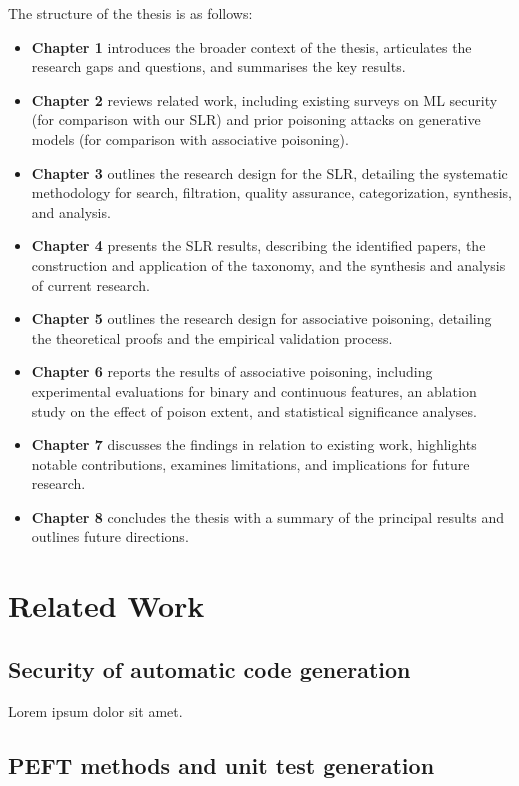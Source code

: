 \documentclass[12pt]{book}
\begin{document}
The structure of the thesis is as follows:
\begin{itemize}
    \item \textbf{Chapter 1} introduces the broader context of the thesis, articulates the research gaps and questions, and summarises the key results.
    \item \textbf{Chapter 2} reviews related work, including existing surveys on ML security (for comparison with our SLR) and prior poisoning attacks on generative models (for comparison with associative poisoning).
    \item \textbf{Chapter 3} outlines the research design for the SLR, detailing the systematic methodology for search, filtration, quality assurance, categorization, synthesis, and analysis.
    \item \textbf{Chapter 4} presents the SLR results, describing the identified papers, the construction and application of the taxonomy, and the synthesis and analysis of current research.
    \item \textbf{Chapter 5} outlines the research design for associative poisoning, detailing the theoretical proofs and the empirical validation process.
    \item \textbf{Chapter 6} reports the results of associative poisoning, including experimental evaluations for binary and continuous features, an ablation study on the effect of poison extent, and statistical significance analyses.
    \item \textbf{Chapter 7} discusses the findings in relation to existing work, highlights notable contributions, examines limitations, and implications for future research.
    \item \textbf{Chapter 8} concludes the thesis with a summary of the principal results and outlines future directions.
\end{itemize}


\chapter{Related Work}

\section{Security of automatic code generation}
Lorem ipsum dolor sit amet.

\section{PEFT methods and unit test generation}
\end{document}
